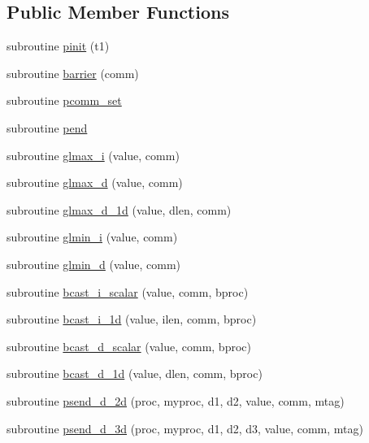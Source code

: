 \subsection*{Public Member Functions}
\begin{DoxyCompactItemize}
\item 
subroutine \hyperlink{classplib__module_ae78d370a89bed99c28b886de57ae82d4}{pinit} (t1)
\item 
subroutine \hyperlink{classplib__module_a4e2a7d994f9e40d73d1f23d195421c88}{barrier} (comm)
\item 
subroutine \hyperlink{classplib__module_ae1bf2353a57332439fe7ceb97a6da009}{pcomm\-\_\-set}
\item 
subroutine \hyperlink{classplib__module_a8c714eb09fefa34353c52b163be411d7}{pend}
\item 
subroutine \hyperlink{classplib__module_a35e1e3d669c7e73e5481bc36b570907d}{glmax\-\_\-i} (value, comm)
\item 
subroutine \hyperlink{classplib__module_add45fae33090e71fdf132f7dcd8d154d}{glmax\-\_\-d} (value, comm)
\item 
subroutine \hyperlink{classplib__module_a1a64b5002b4f6b84133b4b0868fbc3b6}{glmax\-\_\-d\-\_\-1d} (value, dlen, comm)
\item 
subroutine \hyperlink{classplib__module_a1ab0a49a7d10568be52dc00a40bef825}{glmin\-\_\-i} (value, comm)
\item 
subroutine \hyperlink{classplib__module_a6e43b879b8deaee995c90a37345d1248}{glmin\-\_\-d} (value, comm)
\item 
subroutine \hyperlink{classplib__module_aa4dfae87ec1583a68a7fb3756bc4bbb1}{bcast\-\_\-i\-\_\-scalar} (value, comm, bproc)
\item 
subroutine \hyperlink{classplib__module_a5590b2a616e32329753421b685473604}{bcast\-\_\-i\-\_\-1d} (value, ilen, comm, bproc)
\item 
subroutine \hyperlink{classplib__module_a909b81966d60ec8340c1be57c6c5c073}{bcast\-\_\-d\-\_\-scalar} (value, comm, bproc)
\item 
subroutine \hyperlink{classplib__module_adbde05317e41d8723a54e5356627a27f}{bcast\-\_\-d\-\_\-1d} (value, dlen, comm, bproc)
\item 
subroutine \hyperlink{classplib__module_aece115e45bdb1399b9c969366b46404e}{psend\-\_\-d\-\_\-2d} (proc, myproc, d1, d2, value, comm, mtag)
\item 
subroutine \hyperlink{classplib__module_ac202cc24041fff90fa56158d02d64f70}{psend\-\_\-d\-\_\-3d} (proc, myproc, d1, d2, d3, value, comm, mtag)

\end{DoxyCompactItemize}
